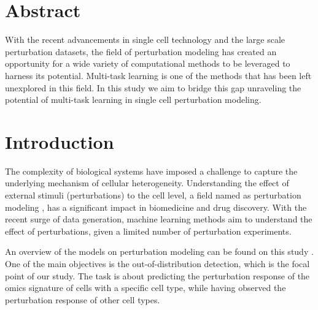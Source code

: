 \documentclass[12pt, a4paper]{article}
\begin{document}



{
\renewcommand*\contentsname{Περιεχόμενα}
\hypersetup{linkcolor=black}
\tableofcontents
}

\thispagestyle{empty}

\clearpage

\section{Abstract}

With the recent advancements in single cell technology and the large scale perturbation datasets, the field of perturbation modeling  has created an opportunity for a wide variety of computational methods to be leveraged to harness its potential. Multi-task learning is one of the methods that has been left unexplored in this field. In this study we aim to bridge this gap unraveling the potential of multi-task learning in single cell perturbation modeling.


\section{Introduction}

The complexity of biological systems have imposed a challenge to capture the underlying mechanism of cellular heterogeneity. Understanding the effect of external stimuli (perturbations) to the cell level, a field named as perturbation modeling \cite{jiMachineLearningPerturbational2021}, has a significant impact in biomedicine and drug discovery. With the recent surge of data generation, machine learning methods aim to understand the effect of perturbations, given a limited number of perturbation experiments. 

An overview of the models on perturbation modeling can be found on this study \cite{gavriilidisMinireviewPerturbationModelling2024}. One of the main objectives is the out-of-distribution detection, which is the focal point of our study. The task is about predicting the perturbation response of the omics signature of cells with a specific cell type, while having observed the perturbation response of other cell types.
\end{document}
